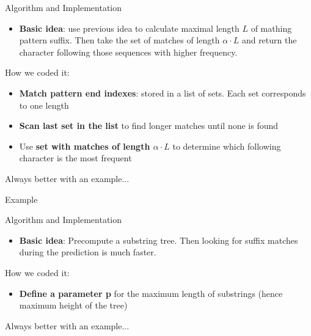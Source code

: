 \documentclass[aspectratio=169]{beamer}
\begin{document}
\begin{frame}{Algorithm and Implementation}
   \begin{itemize}
    \item \textbf{Basic idea}: use previous idea to calculate maximal length $L$ of mathing pattern suffix. Then take the set of matches of length $\alpha \cdot L$ and return the character following those sequences with higher frequency.
  \end{itemize}

  \vspace{\fill}

  How we coded it:
  \begin{itemize}
    \item \textbf{Match pattern end indexes}: stored in a list of sets. Each set corresponds to one length
    \item \textbf{Scan last set in the list} to find longer matches until none is found
    \item Use \textbf{set with matches of length $\alpha \cdot L$} to determine which following character is the most frequent
  \end{itemize}
  \vspace{\fill}

    Always better with an example...

\end{frame}

\begin{frame}{Example}\centering
  
\end{frame}


\begin{frame}{Algorithm and Implementation}
   \begin{itemize}
    \item \textbf{Basic idea}: Precompute a substring tree. Then looking for suffix matches during the prediction is much faster.
  \end{itemize}

  \vspace{\fill}

  How we coded it:
  \begin{itemize}
    \item \textbf{Define a parameter p} for the maximum length of substrings (hence maximum height of the tree)
  \end{itemize}
  \vspace{\fill}

    Always better with an example...

\end{frame}
\end{document}
